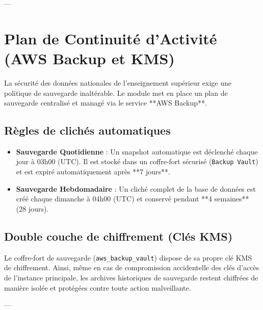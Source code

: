 \documentclass[12pt,a4paper]{article}
\begin{document}
---

\section{Plan de Continuité d'Activité (AWS Backup et KMS)}
La sécurité des données nationales de l'enseignement supérieur exige une politique de sauvegarde inaltérable. Le module met en place un plan de sauvegarde centralisé et managé via le service **AWS Backup**.

\subsection{Règles de clichés automatiques}
\begin{itemize}
    \item \textbf{Sauvegarde Quotidienne} : Un snapshot automatique est déclenché chaque jour à 03h00 (UTC). Il est stocké dans un coffre-fort sécurisé (\texttt{Backup Vault}) et est expiré automatiquement après **7 jours**.
    \item \textbf{Sauvegarde Hebdomadaire} : Un cliché complet de la base de données est créé chaque dimanche à 04h00 (UTC) et conservé pendant **4 semaines** (28 jours).
\end{itemize}

\subsection{Double couche de chiffrement (Clés KMS)}
Le coffre-fort de sauvegarde (\texttt{aws\_backup\_vault}) dispose de sa propre clé KMS de chiffrement. Ainsi, même en cas de compromission accidentelle des clés d'accès de l'instance principale, les archives historiques de sauvegarde restent chiffrées de manière isolée et protégées contre toute action malveillante.

---

\end{document}
